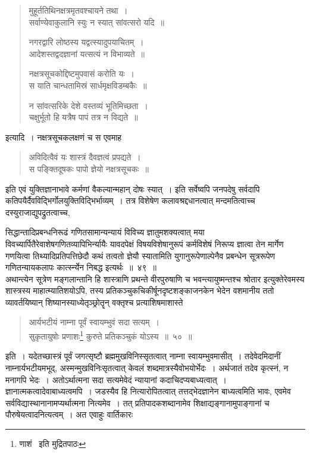 \documentclass[11pt, openany]{book}
\begin{document}
\begin{quote}
{\qt मुहूर्ततिथिनक्षत्रमृतवश्चायने तथा~।\\
सर्वाण्येवाकुलानि स्युः न स्यात् सांवत्सरो यदि~॥

नगरद्वारि लोष्ठस्य यद्वत्स्यादुपयाचितम्~।\\
आदेशस्तद्वदज्ञानां यत्सत्यं न विभाव्यते~॥
	
नक्षत्रसूचकोद्दिष्टमुपवासं करोति यः~।\\
स याति चान्धतामिस्रं सार्धमृक्षविडम्बकैः~॥
	
न सांवत्सरिके देशे वस्तव्यं भूतिमिच्छता~।\\
चक्षुर्भूतो हि यत्रैष पापं तत्र न विद्यते~॥}
\end{quote}	
	
\noindent इत्यादि~। नक्षत्रसूचकलक्षणं च स एवमाह\textendash 
\begin{quote}
{\qt अविदित्वैवं यः शास्त्रं दैवज्ञत्वं प्रपद्यते~।\\
	स पङ्क्तिदूषकः पापो ज्ञेयो नक्षत्रसूचकः~॥}
	\end{quote}

\noindent इति एवं युक्तिज्ञानाभावे कर्मणां वैकल्यान्महान् दोषः स्यात्~। इति सर्वेष्वपि जनपदेषु सर्वदापि कतिपयैर्दैवविद्भिर्गोलयुक्तिविद्भिर्भाव्यम्~। तत्र विशेषेण कलावश्रद्दधानत्वात् मन्दमतित्वाच्च दस्युराजाद्युपद्रुतत्वाच्च,

\newpage

\noindent सिद्धान्तादिप्रबन्धनिरूढं गणितसामान्यन्यायं विविच्य ज्ञातुमशक्यत्वात् मया विवच्यार्पितैरेवाशेषगणितव्यापिभिर्न्यायैः यावदपेक्षं विषयविशेषानुरूपं कर्मविशेषं निरूप्य ज्ञात्वा तेन मार्गेण गणयित्वा तिथ्यादिप्रतिपत्तिछेदौ कथं तत्वतो ज्ञेयौ स्यातामिति युगानुरूपेणाल्पेनैव
प्रबन्धेन सूत्ररूपेण गणितन्यायकलापः कार्त्स्न्येन निबद्ध इत्यर्थः~॥~४९~॥\\

\indent अथान्त्येन सूत्रेण {\qt मङ्गलान्तानि हि शास्त्राणि प्रथन्ते वीरपुरुषाणि च भवन्त्यायुष्मन्तश्च श्रोतार} इत्युक्तेरेवमस्य शास्त्रस्य
माहात्म्यातिशयोऽपि, तस्य प्रतिकञ्चुकचिकीर्षूनदृष्टशङ्काजनकेन भेदेन वशमानीय ततो व्यावर्तयिष्यान् शिष्यानस्याध्येतृञ्छ्रोतॄन् वक्तृश्च प्रत्याशिषमाशास्ते\textendash 

\begin{quote}
{\ab आर्यभटीयं नाम्ना पूर्वं स्वायम्भुवं सदा सत्यम्~।\\
सुकृतायुषोः प्रणाशः\renewcommand{\thefootnote}{१}\footnote{णाशं \textendash\ इति मुद्रितपाठः} कुरुते प्रतिकञ्चुकं योऽस्य~॥~५०~॥}
\end{quote}

\indent इति~। यदेतच्छास्त्रं पूर्वं जगत्सृष्टौ ब्रह्ममुखविनिस्सृतत्वात् नाम्ना स्वायम्भुवमासीत्~। तदेवेदमिदानीं नाम्नार्यभटीयमभूद्, अस्मन्मुखविनिःसृतत्वात् केवलं शब्दमात्रस्यैवोभयोर्भेदः~। अर्थजातं तदेव कृत्स्नं, न मनागपि भेदः~। अतोऽर्थात्मना सदा सत्यमेवेदं न्यायानां
कदाचिदप्यबाध्यत्वात्~। ज्ञानात्मकत्वादेवाबाध्यत्वमपि~। जडस्यैव हि नित्यारोपितत्वात् तत्तद्भेदज्ञानेन बाध्यत्वमिति भावः, एवमेव
सर्वविद्यास्थानानामप्यर्थात्मना नित्यमेव~। तत् प्रतिपादकशब्दानामेव शिक्षाद्यङ्गानामुपाङ्गानां च पौरुषेयत्वादनित्यत्वम्~। अत एवाहुः वार्तिकारः\textendash 
\end{document}
